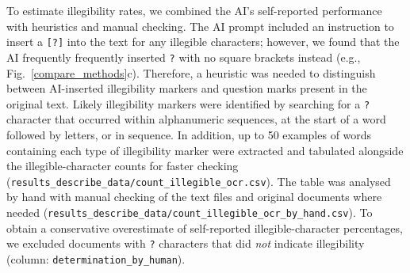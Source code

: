 \documentclass[12pt]{article}
\begin{document}
To estimate illegibility rates,
we combined the AI's self-reported performance with heuristics
and manual checking.
The AI prompt included an instruction to 
insert a {\tt [?]} into the text for any illegible characters;
however,
we found that the AI frequently frequently inserted {\tt ?} 
with no square brackets instead (e.g., Fig.~\ref{compare_methods}c).
Therefore,
a heuristic was needed to distinguish between AI-inserted illegibility markers
and question marks present in the original text.
Likely illegibility markers were identified by 
searching for a {\tt ?} character that occurred
within alphanumeric sequences, 
at the start of a word followed by letters, or in sequence.
In addition, up to 50 examples of words containing each type of illegibility
marker were extracted and tabulated alongside the 
illegible-character counts for faster checking
({\tt results\_describe\_data/count\_illegible\_ocr.csv}).
The table was analysed by hand
with manual checking of the text files and original documents where needed
({\tt results\_describe\_data/count\_illegible\_ocr\_by\_hand.csv}).
To obtain a conservative overestimate
of self-reported illegible-character percentages,
we excluded documents with {\tt ?} characters that did \emph{not} indicate
illegibility (column: {\tt determination\_by\_human}).
\end{document}
